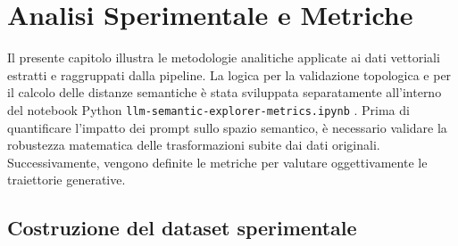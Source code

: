 \section{Analisi Sperimentale e Metriche}
\label{sec:metriche}

Il presente capitolo illustra le metodologie analitiche applicate ai dati vettoriali estratti e raggruppati dalla pipeline. La logica per la validazione topologica e per il calcolo delle distanze semantiche è stata sviluppata separatamente all'interno del notebook Python \texttt{llm-semantic-explorer-metrics.ipynb} \cite{notebook_metrics}. Prima di quantificare l'impatto dei prompt sullo spazio semantico, è necessario validare la robustezza matematica delle trasformazioni subite dai dati originali. Successivamente, vengono definite le metriche per valutare oggettivamente le traiettorie generative.

\subsection{Costruzione del dataset sperimentale}
\label{sec:dataset_sperimentali}

